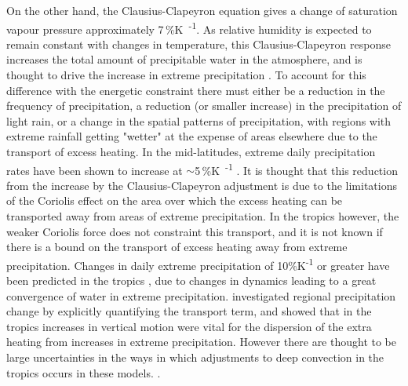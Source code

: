 On the other hand, the Clausius-Clapeyron equation gives a change of saturation vapour pressure approximately 7\,\%\unit{K\textsuperscript{-1}}.
As relative humidity is expected to remain constant with changes in temperature, this Clausius-Clapeyron response increases the total amount of precipitable water in the atmosphere, and is thought to drive the increase in extreme precipitation \citep{ogorman_precipitation_2015}.
To account for this difference with the energetic constraint there must either be a reduction in the frequency of precipitation, a reduction (or smaller increase) in the precipitation of light rain, or a change in the spatial patterns of precipitation, with regions with extreme rainfall getting "wetter" at the expense of areas elsewhere due to the transport of excess heating.
In the mid-latitudes, extreme daily precipitation rates have been shown to increase at $\sim$5\,\%\unit{K\textsuperscript{-1}} \citep{ogorman_physical_2009}.
It is thought that this reduction from the increase by the Clausius-Clapeyron adjustment is due to the limitations of the Coriolis effect on the area over which the excess heating can be transported away from areas of extreme precipitation.
In the tropics however, the weaker Coriolis force does not constraint this transport, and it is not known if there is a bound on the transport of excess heating away from extreme precipitation.
Changes in daily extreme precipitation of 10\%K\textsuperscript{-1} or greater have been predicted in the tropics \citep{ogorman_energetic_2012}, due to changes in dynamics leading to a great convergence of water in extreme precipitation.
\citet{muller_energetic_2011} investigated regional precipitation change by explicitly quantifying the transport term, and showed that in the tropics increases in vertical motion were vital for the dispersion of the extra heating from increases in extreme precipitation.
However there are thought to be large uncertainties in the ways in which adjustments to deep convection in the tropics occurs in these models. \citep{westra_future_2014}.

